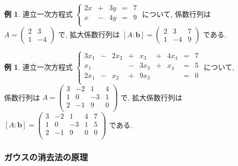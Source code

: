 \documentclass[dvipdfmx,a4paper,11pt]{article}
\theoremstyle{definition}
\newtheorem{exa}[thm]{例}
\begin{document}
 \begin{exa}
 連立一次方程式
 $
 \left\{ 
\begin{matrix}
2x&+&3y& = &7 \\
x&-&4y& = &9 \\
\end{matrix}
\right.
 $
 について, 係数行列は
 $A = 
 \begin{pmatrix}
 2 & 3 \\
 1 & -4
 \end{pmatrix}
 $
 で, 拡大係数行列は
 $[A : \bm{b}] = 
  \begin{pmatrix}
 2 & 3  &7\\
 1 & -4 &9
 \end{pmatrix}
 $
 である.
 \end{exa}
 
  \begin{exa}
 連立一次方程式
 $
 \left\{ 
\begin{matrix}
3x_1&-&2x_2& +& x_3 &+& 4x_4 &=& 7 \\
x_1 &  & 	   & -& 3x_3 &+& x_4 &=& 5 \\
2x_1&-& x_2& +& 9x_3 & & 	 &=& 0 \\
\end{matrix}
\right.
 $
 について, \\
 係数行列は
 $A = 
 \begin{pmatrix}
 3 & -2  & 1&4\\
 1 & 0   & -3&1\\
2 & -1  & 9&0\\
 \end{pmatrix}
 $
 で, 拡大係数行列は
 $[A : \bm{b}] = 
 \begin{pmatrix}
 3 & -2  & 1&4 & 7\\
 1 & 0   & -3&1 &5\\
2 & -1  & 9&0 & 0\\
 \end{pmatrix}
 $
 である.
 \end{exa}

\subsubsection{ガウスの消去法の原理}
\end{document}
